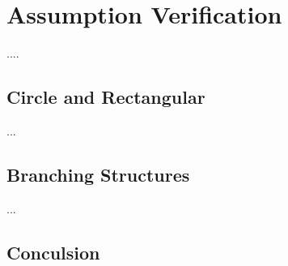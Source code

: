 \section{Assumption Verification}


....



\subsection{Circle and Rectangular}


...



\subsection{Branching Structures}


...


\subsection{Conculsion}


